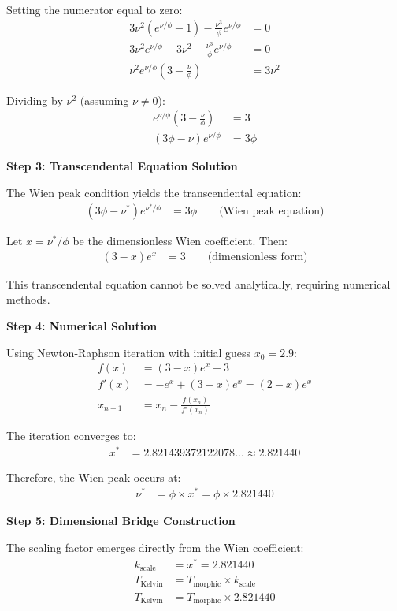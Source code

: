 Setting the numerator equal to zero:
\begin{align}
3\nu^2(e^{\nu/\phi} - 1) - \frac{\nu^3}{\phi} e^{\nu/\phi} &= 0 \\
3\nu^2 e^{\nu/\phi} - 3\nu^2 - \frac{\nu^3}{\phi} e^{\nu/\phi} &= 0 \\
\nu^2 e^{\nu/\phi}\left(3 - \frac{\nu}{\phi}\right) &= 3\nu^2
\end{align}

Dividing by $\nu^2$ (assuming $\nu \neq 0$):
\begin{align}
e^{\nu/\phi}\left(3 - \frac{\nu}{\phi}\right) &= 3 \\
(3\phi - \nu) e^{\nu/\phi} &= 3\phi
\end{align}

\textbf{Step 3: Transcendental Equation Solution}

The Wien peak condition yields the transcendental equation:
\begin{align}
(3\phi - \nu^*) e^{\nu^*/\phi} &= 3\phi \qquad \text{(Wien peak equation)}
\end{align}

Let $x = \nu^*/\phi$ be the dimensionless Wien coefficient. Then:
\begin{align}
(3 - x) e^x &= 3 \qquad \text{(dimensionless form)}
\end{align}

This transcendental equation cannot be solved analytically, requiring numerical methods.

\textbf{Step 4: Numerical Solution}

Using Newton-Raphson iteration with initial guess $x_0 = 2.9$:
\begin{align}
f(x) &= (3 - x)e^x - 3 \\
f'(x) &= -e^x + (3 - x)e^x = (2 - x)e^x \\
x_{n+1} &= x_n - \frac{f(x_n)}{f'(x_n)}
\end{align}

The iteration converges to:
\begin{align}
x^* &= 2.821439372122078... \approx 2.821440
\end{align}

Therefore, the Wien peak occurs at:
\begin{align}
\nu^* &= \phi \times x^* = \phi \times 2.821440
\end{align}

\textbf{Step 5: Dimensional Bridge Construction}

The scaling factor emerges directly from the Wien coefficient:
\begin{align}
k_{\text{scale}} &= x^* = 2.821440 \\
T_{\text{Kelvin}} &= T_{\text{morphic}} \times k_{\text{scale}} \\
T_{\text{Kelvin}} &= T_{\text{morphic}} \times 2.821440
\end{align}

